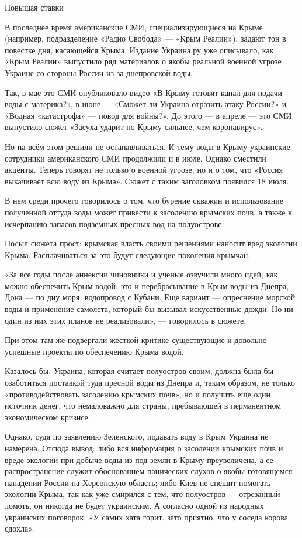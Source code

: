\documentclass[a4paper,11pt]{extreport}
\begin{document}
Повышая ставки

В последнее время американские СМИ, специализирующиеся на Крыме (например, подразделение «Радио Свобода» --- «Крым Реалии»), задают тон в повестке дня, касающейся Крыма. Издание Украина.ру уже описывало, как «Крым Реалии» выпустило ряд материалов о якобы реальной военной угрозе Украине со стороны России из-за днепровской воды.

Так, в мае это СМИ опубликовало видео «В Крыму готовят канал для подачи воды с материка?», в июне --- «Сможет ли Украина отразить атаку России?» и «Водная «катастрофа» --- повод для войны?». До этого --- в апреле --- это СМИ выпустило сюжет «Засуха ударит по Крыму сильнее, чем коронавирус».

Но на всём этом решили не останавливаться. И тему воды в Крыму украинские сотрудники американского СМИ продолжили и в июле. Однако сместили акценты. Теперь говорят не только о военной угрозе, но и о том, что «Россия выкачивает всю воду из Крыма». Сюжет с таким заголовком появился 18 июля.

В нем среди прочего говорилось о том, что бурение скважин и использование полученной оттуда воды может привести к засолению крымских почв, а также к исчерпанию запасов подземных пресных вод на полуострове.

Посыл сюжета прост: крымская власть своими решениями наносит вред экологии Крыма. Расплачиваться за это будут следующие поколения крымчан.

«За все годы после аннексии чиновники и ученые озвучили много идей, как можно обеспечить Крым водой: это и перебрасывание в Крым воды из Днепра, Дона --- по дну моря, водопровод с Кубани. Еще вариант --- опреснение морской воды и применение самолета, который бы вызывал искусственные дожди. Но ни один из них этих планов не реализовали», --- говорилось в сюжете.

При этом там же подвергали жесткой критике существующие и довольно успешные проекты по обеспечению Крыма водой.

Казалось бы, Украина, которая считает полуостров своим, должна была бы озаботиться поставкой туда пресной воды из Днепра и, таким образом, не только «противодействовать засолению крымских почв», но и получить еще один источник денег, что немаловажно для страны, пребывающей в перманентном экономическом кризисе.

Однако, судя по заявлению Зеленского, подавать воду в Крым Украина не намерена. Отсюда вывод: либо вся информация о засолении крымских почв и вреде экологии при добыче воды из-под земли в Крыму преувеличена, а ее распространение служит обоснованием панических слухов о якобы готовящемся нападении России на Херсонскую область; либо Киев не спешит помогать экологии Крыма, так как уже смирился с тем, что полуостров --- отрезанный ломоть, он никогда не будет украинским. А согласно одной из народных украинских поговорок, «У самих хата горит, зато приятно, что у соседа корова сдохла».
\end{document}
